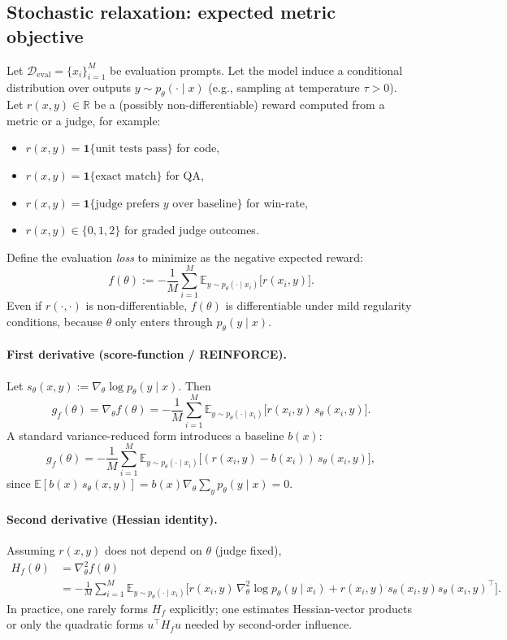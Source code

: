 \documentclass{article}
\theoremstyle{plain}
\theoremstyle{definition}
\theoremstyle{remark}
\begin{document}
\subsection{Stochastic relaxation: expected metric objective}
Let $\mathcal{D}_{\mathrm{eval}}=\{x_i\}_{i=1}^M$ be evaluation prompts.
Let the model induce a conditional distribution over outputs
$y \sim p_\theta(\cdot \mid x)$ (e.g., sampling at temperature $\tau>0$).
Let $r(x,y)\in \mathbb{R}$ be a (possibly non-differentiable) reward computed from a metric or a judge,
for example:
\begin{itemize}
\item $r(x,y)=\mathbf{1}\{\text{unit tests pass}\}$ for code,
\item $r(x,y)=\mathbf{1}\{\text{exact match}\}$ for QA,
\item $r(x,y)=\mathbf{1}\{\text{judge prefers } y \text{ over baseline}\}$ for win-rate,
\item $r(x,y)\in\{0,1,2\}$ for graded judge outcomes.
\end{itemize}
Define the evaluation \emph{loss} to minimize as the negative expected reward:
\begin{equation}
f(\theta)
:=
-\frac{1}{M}\sum_{i=1}^M
\mathbb{E}_{y \sim p_\theta(\cdot\mid x_i)}\big[r(x_i,y)\big].
\label{eq:expected_metric_f}
\end{equation}
Even if $r(\cdot,\cdot)$ is non-differentiable, $f(\theta)$ is differentiable under mild regularity conditions,
because $\theta$ only enters through $p_\theta(y\mid x)$.

\paragraph{First derivative (score-function / REINFORCE).}
Let $s_\theta(x,y):=\nabla_\theta \log p_\theta(y\mid x)$.
Then
\begin{equation}
g_f(\theta)
=
\nabla_\theta f(\theta)
=
-\frac{1}{M}\sum_{i=1}^M
\mathbb{E}_{y \sim p_\theta(\cdot\mid x_i)}
\Big[r(x_i,y)\, s_\theta(x_i,y)\Big].
\label{eq:gf_reinforce}
\end{equation}
A standard variance-reduced form introduces a baseline $b(x)$:
\[
g_f(\theta)
=
-\frac{1}{M}\sum_{i=1}^M
\mathbb{E}_{y \sim p_\theta(\cdot\mid x_i)}
\Big[(r(x_i,y)-b(x_i))\, s_\theta(x_i,y)\Big],
\]
since $\mathbb{E}[b(x)\,s_\theta(x,y)]=b(x)\nabla_\theta \sum_y p_\theta(y\mid x)=0$.

\paragraph{Second derivative (Hessian identity).}
Assuming $r(x,y)$ does not depend on $\theta$ (judge fixed),
\begin{align}
H_f(\theta)
&=
\nabla_\theta^2 f(\theta)\nonumber\\
&=
-\frac{1}{M}\sum_{i=1}^M
\mathbb{E}_{y \sim p_\theta(\cdot\mid x_i)}
\Big[
r(x_i,y)\,\nabla_\theta^2 \log p_\theta(y\mid x_i)
+
r(x_i,y)\, s_\theta(x_i,y)s_\theta(x_i,y)^\top
\Big].
\label{eq:Hf_score_function}
\end{align}
In practice, one rarely forms $H_f$ explicitly; one estimates Hessian-vector products
or only the quadratic forms $u^\top H_f u$ needed by second-order influence.
\end{document}
